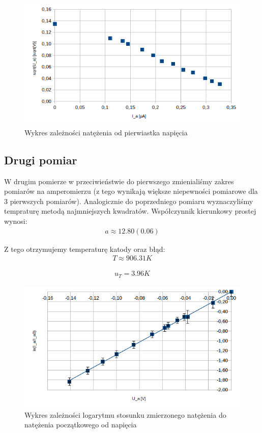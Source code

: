 \documentclass[a4paper]{article}
\begin{document}
\begin{figure}
	\includegraphics[scale=1]{T1_Ia_sqrtU}
	\centering
	\caption{Wykres zależności natężenia od pierwiastka napięcia}
\end{figure}


\subsection{Drugi pomiar}
W drugim pomierze w przeciwieństwie do pierwszego zmienialiśmy zakres pomiarów na amperomierzu (z tego wynikają większe niepewności pomiarowe dla 3 pierwszych pomiarów). Analogicznie do poprzedniego pomiaru wyznaczyliśmy tempraturę metodą najmniejszych kwadratów. Współczynnik kierunkowy prostej wynosi:
\begin{align*}
a \approx 12.80 (0.06)
\end{align*}

Z tego otrzymujemy temperaturę katody oraz błąd:
\begin{align*}
T \approx 906.31 K
\end{align*}

\begin{align*}
u_{T} = 3.96 K
\end{align*}



\begin{figure}
	\includegraphics[scale=1]{T2_ln_U}
	\centering
	\caption{Wykres zależności logarytmu stosunku zmierzonego natężenia do natężenia początkowego od napięcia}
\end{figure}
\end{document}
